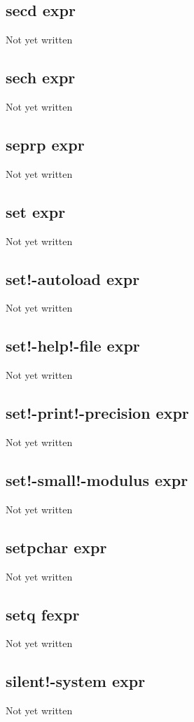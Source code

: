 \documentclass[a4paper,11pt]{article}
\begin{document}
\subsection{\ttfamily secd expr}
Not yet written

\subsection{\ttfamily sech expr}
Not yet written

\subsection{\ttfamily seprp expr}
Not yet written

\subsection{\ttfamily set expr}
Not yet written

\subsection{\ttfamily set!-autoload expr}
Not yet written

\subsection{\ttfamily set!-help!-file expr}
Not yet written

\subsection{\ttfamily set!-print!-precision expr}
Not yet written

\subsection{\ttfamily set!-small!-modulus expr}
Not yet written

\subsection{\ttfamily setpchar expr}
Not yet written

\subsection{\ttfamily setq fexpr}
Not yet written

\subsection{\ttfamily silent!-system expr}
Not yet written
\end{document}
